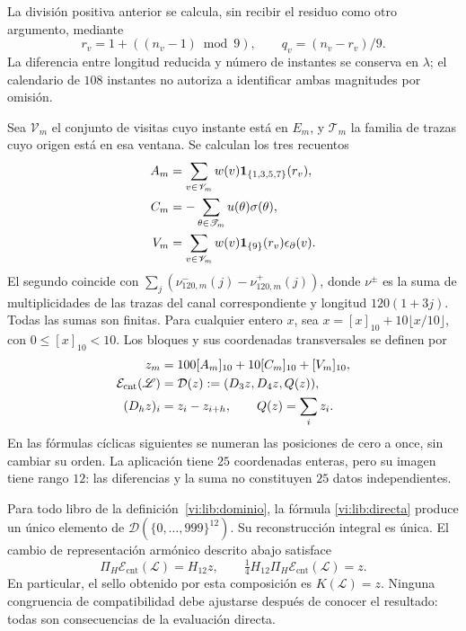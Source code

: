 La división positiva anterior se calcula, sin recibir el residuo como
otro argumento, mediante
\[
 r_v=1+((n_v-1)\bmod9),\qquad q_v=(n_v-r_v)/9.
\]
La diferencia entre longitud reducida y número de instantes se conserva
en \(\lambda\); el calendario de \(108\) instantes no autoriza a
identificar ambas magnitudes por omisión.

Sea \(\mathscr V_m\) el conjunto de visitas cuyo instante está en
\(E_m\), y \(\mathscr T_m\) la familia de trazas cuyo origen está en
esa ventana. Se calculan los tres recuentos
\begin{align}
 A_m&=\sum_{v\in\mathscr V_m}w(v)
              \mathbf1_{\{1,3,5,7\}}(r_v),\notag\\
 C_m&=-\sum_{\theta\in\mathscr T_m}u(\theta)\sigma(\theta),\notag\\
 V_m&=\sum_{v\in\mathscr V_m}w(v)
              \mathbf1_{\{9\}}(r_v)\epsilon_\partial(v).
 \label{vi:lib:recuentos}
\end{align}
El segundo coincide con
\(\sum_j(\nu^-_{120,m}(j)-\nu^+_{120,m}(j))\), donde
\(\nu^\pm\) es la suma de multiplicidades de las trazas del canal
correspondiente y longitud \(120(1+3j)\). Todas las sumas son finitas.
Para cualquier entero \(x\), sea
\(x=[x]_{10}+10\lfloor x/10\rfloor\), con \(0\le[x]_{10}<10\).
Los bloques y sus coordenadas transversales se definen por
\begin{align}
 z_m&=100[A_m]_{10}+10[C_m]_{10}+[V_m]_{10},\notag\\
 \mathcal E_{\mathrm{cnt}}(\mathscr L)
   &=\mathcal D(z):=(D_3z,D_4z,Q(z)),\label{vi:lib:directa}\\
 (D_hz)_i&=z_i-z_{i+h},\qquad Q(z)=\sum_i z_i.\notag
\end{align}
En las fórmulas cíclicas siguientes se numeran las posiciones de cero
a once, sin cambiar su orden. La aplicación tiene \(25\) coordenadas
enteras, pero su imagen tiene rango \(12\): las diferencias y la suma
no constituyen \(25\) datos independientes.

\begin{theorem}
\label{vi:lib:composicion}
Para todo libro de la definición~\ref{vi:lib:dominio}, la fórmula
\eqref{vi:lib:directa} produce un único elemento de
\(\mathcal D(\{0,\ldots,999\}^{12})\). Su reconstrucción integral
es única. El cambio de representación armónico descrito abajo satisface
\[
 \Pi_H\mathcal E_{\mathrm{cnt}}(\mathscr L)=H_{12}z,
 \qquad
 \tfrac14H_{12}\Pi_H\mathcal E_{\mathrm{cnt}}(\mathscr L)=z.
\]
En particular, el sello obtenido por esta composición es \(K(\mathscr L)=z\).
Ninguna congruencia de compatibilidad debe ajustarse después de conocer
el resultado: todas son consecuencias de la evaluación directa.
\end{theorem}

